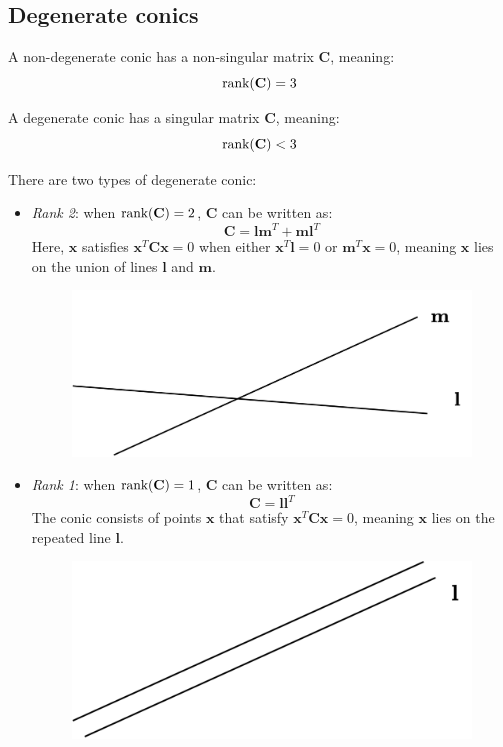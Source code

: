 \subsection{Degenerate conics}
\begin{definition}
    A non-degenerate conic has a non-singular matrix $\mathbf{C}$, meaning:
    \[\textnormal{rank}(\mathbf{C})=3\]
\end{definition}
\begin{definition}
    A degenerate conic has a singular matrix $\mathbf{C}$, meaning:
    \[\textnormal{rank}(\mathbf{C}) < 3\]
\end{definition}
There are two types of degenerate conic: 
\begin{itemize}
    \item \textit{Rank 2}: when $\textnormal{rank}(\mathbf{C}) = 2$, $\mathbf{C}$ can be written as:
        \[\mathbf{C}=\mathbf{lm}^T+\mathbf{ml}^T\]
        Here, $\mathbf{x}$ satisfies $\mathbf{x}^T \mathbf{Cx} = 0$ when either $\mathbf{x}^T \mathbf{l} = 0$ or $\mathbf{m}^T \mathbf{x} = 0$, meaning $\mathbf{x}$ lies on the union of lines $\mathbf{l}$ and $\mathbf{m}$.
        \begin{figure}[H]
            \centering
            \includegraphics[width=0.35\linewidth]{images/inters.png}
        \end{figure}
    \item \textit{Rank 1}: when $\textnormal{rank}(\mathbf{C}) = 1$, $\mathbf{C}$ can be written as:
        \[\mathbf{C}=\mathbf{ll}^T\]
        The conic consists of points $\mathbf{x}$ that satisfy $\mathbf{x}^T \mathbf{Cx} = 0$, meaning $\mathbf{x}$ lies on the repeated line $\mathbf{l}$.
        \begin{figure}[H]
            \centering
            \includegraphics[width=0.35\linewidth]{images/rep.png}
        \end{figure}
\end{itemize}